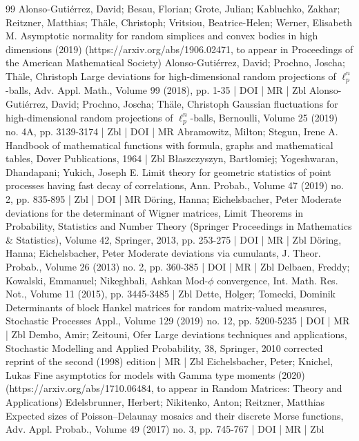 \begin{thebibliography}{99}
Alonso-Gutiérrez, David; Besau, Florian; Grote, Julian; Kabluchko, Zakhar; Reitzner, Matthias; Thäle, Christoph; Vritsiou, Beatrice-Helen; Werner, Elisabeth M. Asymptotic normality for random simplices and convex bodies in high dimensions (2019) (https://arxiv.org/abs/1906.02471, to appear in Proceedings of the American Mathematical Society)
Alonso-Gutiérrez, David; Prochno, Joscha; Thäle, Christoph Large deviations for high-dimensional random projections of $\ell _p^n$-balls, Adv. Appl. Math., Volume 99 (2018), pp. 1-35 | DOI | MR | Zbl
Alonso-Gutiérrez, David; Prochno, Joscha; Thäle, Christoph Gaussian fluctuations for high-dimensional random projections of $\ell _p^n$-balls, Bernoulli, Volume 25 (2019) no. 4A, pp. 3139-3174 | Zbl | DOI | MR
Abramowitz, Milton; Stegun, Irene A. Handbook of mathematical functions with formula, graphs and mathematical tables, Dover Publications, 1964 | Zbl
Błaszczyszyn, Bartłomiej; Yogeshwaran, Dhandapani; Yukich, Joseph E. Limit theory for geometric statistics of point processes having fast decay of correlations, Ann. Probab., Volume 47 (2019) no. 2, pp. 835-895 | Zbl | DOI | MR
Döring, Hanna; Eichelsbacher, Peter Moderate deviations for the determinant of Wigner matrices, Limit Theorems in Probability, Statistics and Number Theory (Springer Proceedings in Mathematics \& Statistics), Volume 42, Springer, 2013, pp. 253-275 | DOI | MR | Zbl
Döring, Hanna; Eichelsbacher, Peter Moderate deviations via cumulants, J. Theor. Probab., Volume 26 (2013) no. 2, pp. 360-385 | DOI | MR | Zbl
Delbaen, Freddy; Kowalski, Emmanuel; Nikeghbali, Ashkan Mod-$\phi $ convergence, Int. Math. Res. Not., Volume 11 (2015), pp. 3445-3485 | Zbl
Dette, Holger; Tomecki, Dominik Determinants of block Hankel matrices for random matrix-valued measures, Stochastic Processes Appl., Volume 129 (2019) no. 12, pp. 5200-5235 | DOI | MR | Zbl
Dembo, Amir; Zeitouni, Ofer Large deviations techniques and applications, Stochastic Modelling and Applied Probability, 38, Springer, 2010 corrected reprint of the second (1998) edition | MR | Zbl
Eichelsbacher, Peter; Knichel, Lukas Fine asymptotics for models with Gamma type moments (2020) (https://arxiv.org/abs/1710.06484, to appear in Random Matrices: Theory and Applications)
Edelsbrunner, Herbert; Nikitenko, Anton; Reitzner, Matthias Expected sizes of Poisson–Delaunay mosaics and their discrete Morse functions, Adv. Appl. Probab., Volume 49 (2017) no. 3, pp. 745-767 | DOI | MR | Zbl

\end{thebibliography}
